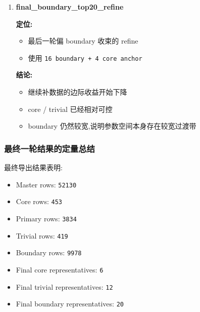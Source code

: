 \documentclass[lang=cn,scheme=chinese,color=blue,device=normal,toc=onecol,math=cm]{elegantbook}
\begin{document}
\begin{enumerate}
\textbf{结论:}\par
 
\begin{itemize}
\item Level B 再次提升
\item 同时表明模型开始整体更偏 topo
\item 原来适合旧模型的 joint 阈值不再适合新模型,需要重新校准
\end{itemize}
\item \textbf{final\_\allowbreak{}boundary\_\allowbreak{}top20\_\allowbreak{}refine}\par
 
\textbf{定位:}\par
 
\begin{itemize}
\item 最后一轮偏 boundary 收束的 refine
\item 使用 \texttt{16 boundary + 4 core anchor}
\end{itemize}
 
\textbf{结论:}\par
 
\begin{itemize}
\item 继续补数据的边际收益开始下降
\item core /\allowbreak{} trivial 已经相对可控
\item boundary 仍然较宽,说明参数空间本身存在较宽过渡带
\end{itemize}
\end{enumerate}


\subsubsection{最终一轮结果的定量总结}


最终导出结果表明:\par


\begin{itemize}
\item Master rows: \texttt{52130}
\item Core rows: \texttt{453}
\item Primary rows: \texttt{3834}
\item Trivial rows: \texttt{419}
\item Boundary rows: \texttt{9978}
\item Final core representatives: \texttt{6}
\item Final trivial representatives: \texttt{12}
\item Final boundary representatives: \texttt{20}
\end{itemize}
\end{document}
